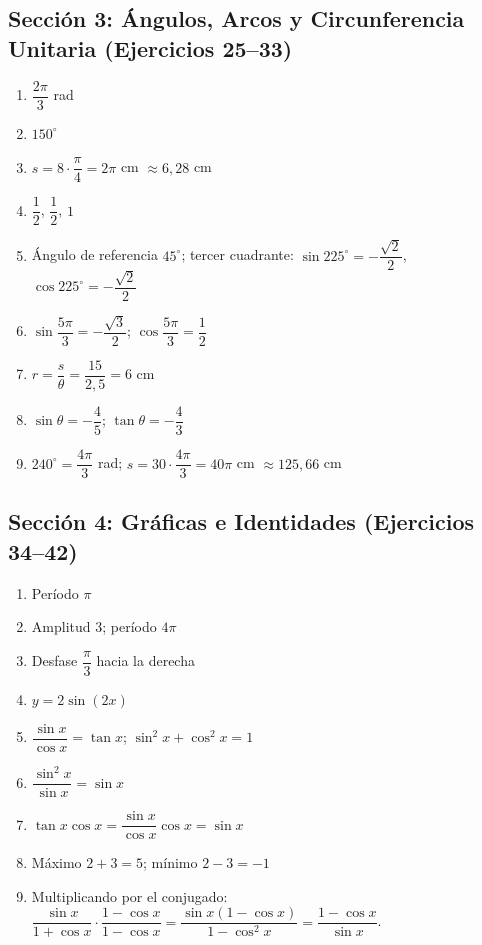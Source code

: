 \documentclass[12pt, letterpaper]{article}
\begin{document}
  \subsection*{Sección 3: Ángulos, Arcos y Circunferencia Unitaria (Ejercicios 25--33)}
  \begin{enumerate}[resume=respuestas, leftmargin=*, label=\textbf{\arabic*.}]
    \item $\dfrac{2\pi}{3}$ rad
    \item $150^\circ$
    \item $s = 8 \cdot \dfrac{\pi}{4} = 2\pi$ cm $\approx 6{,}28$ cm
    \item $\dfrac{1}{2}$, $\dfrac{1}{2}$, $1$
    \item Ángulo de referencia $45^\circ$; tercer cuadrante: $\sin 225^\circ = -\dfrac{\sqrt{2}}{2}$, $\cos 225^\circ = -\dfrac{\sqrt{2}}{2}$
    \item $\sin \dfrac{5\pi}{3} = -\dfrac{\sqrt{3}}{2}$; \quad $\cos \dfrac{5\pi}{3} = \dfrac{1}{2}$
    \item $r = \dfrac{s}{\theta} = \dfrac{15}{2{,}5} = 6$ cm
    \item $\sin \theta = -\dfrac{4}{5}$; \quad $\tan \theta = -\dfrac{4}{3}$
    \item $240^\circ = \dfrac{4\pi}{3}$ rad; \quad $s = 30 \cdot \dfrac{4\pi}{3} = 40\pi$ cm $\approx 125{,}66$ cm
  \end{enumerate}

  \subsection*{Sección 4: Gráficas e Identidades (Ejercicios 34--42)}
  \begin{enumerate}[resume=respuestas, leftmargin=*, label=\textbf{\arabic*.}]
    \item Período $\pi$
    \item Amplitud 3; período $4\pi$
    \item Desfase $\dfrac{\pi}{3}$ hacia la derecha
    \item $y = 2\sin(2x)$
    \item $\dfrac{\sin x}{\cos x} = \tan x$; \quad $\sin^2 x + \cos^2 x = 1$
    \item $\dfrac{\sin^2 x}{\sin x} = \sin x$
    \item $\tan x \cos x = \dfrac{\sin x}{\cos x} \cos x = \sin x$
    \item Máximo $2 + 3 = 5$; \quad mínimo $2 - 3 = -1$
    \item Multiplicando por el conjugado: $\dfrac{\sin x}{1 + \cos x} \cdot \dfrac{1 - \cos x}{1 - \cos x} = \dfrac{\sin x(1 - \cos x)}{1 - \cos^2 x} = \dfrac{1 - \cos x}{\sin x}$.
  \end{enumerate}
\end{document}
